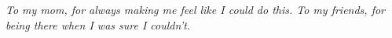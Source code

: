 


\vspace*{3cm}

\medskip

\begin{center}
\textit{To my mom, for always making me feel like I could do this.
To my friends, for being there when I was sure I couldn't.} \\ \smallskip
\end{center}
